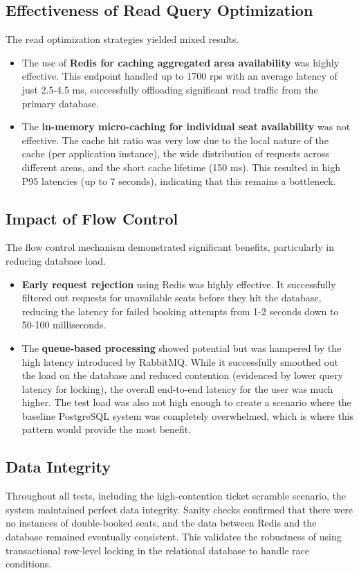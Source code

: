 \documentclass{ieeeaccess}
\begin{document}
\subsection{Effectiveness of Read Query Optimization}
The read optimization strategies yielded mixed results.
\begin{itemize}
\item The use of \textbf{Redis for caching aggregated area availability} was highly effective. This endpoint handled up to 1700 rps with an average latency of just 2.5-4.5 ms, successfully offloading significant read traffic from the primary database.
\item The \textbf{in-memory micro-caching for individual seat availability} was not effective. The cache hit ratio was very low due to the local nature of the cache (per application instance), the wide distribution of requests across different areas, and the short cache lifetime (150 ms). This resulted in high P95 latencies (up to 7 seconds), indicating that this remains a bottleneck.
\end{itemize}

\subsection{Impact of Flow Control}
The flow control mechanism demonstrated significant benefits, particularly in reducing database load.
\begin{itemize}
\item \textbf{Early request rejection} using Redis was highly effective. It successfully filtered out requests for unavailable seats before they hit the database, reducing the latency for failed booking attempts from 1-2 seconds down to 50-100 milliseconds.
\item The \textbf{queue-based processing} showed potential but was hampered by the high latency introduced by RabbitMQ. While it successfully smoothed out the load on the database and reduced contention (evidenced by lower query latency for locking), the overall end-to-end latency for the user was much higher. The test load was also not high enough to create a scenario where the baseline PostgreSQL system was completely overwhelmed, which is where this pattern would provide the most benefit.
\end{itemize}

\subsection{Data Integrity}
Throughout all tests, including the high-contention ticket scramble scenario, the system maintained perfect data integrity. Sanity checks confirmed that there were no instances of double-booked seats, and the data between Redis and the database remained eventually consistent. This validates the robustness of using transactional row-level locking in the relational database to handle race conditions.
\end{document}
